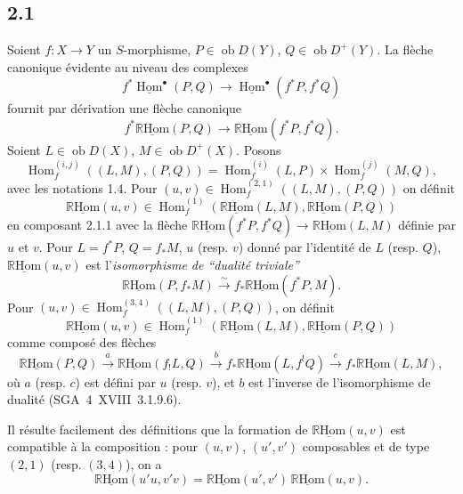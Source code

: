 \documentclass[11pt]{article}
\DeclareMathOperator{\Hom}{Hom}
\newcommand{\R}{\mathbb{R}}\newcommand{\RHomCore}{\mathbb{R}\mathrm{Hom}}
\newcommand{\ob}{\operatorname{ob}}
\providecommand{\RHom}{\RHomCore}
\providecommand{\uRHom}{\underline{\RHom}}
\providecommand{\RHom}{\RHomCore}
\providecommand{\Hom}{\operatorname{Hom}}
\providecommand{\ob}{\operatorname{ob}}
\providecommand{\RHom}{\R\mathcal{H}om}
\providecommand{\R}{\mathrm R}
\providecommand{\RHom}{\RHomCore}
\providecommand{\Hom}{\operatorname{Hom}}
\begin{document}
\subsection*{2.1}
Soient $f:X\to Y$ un $S$-morphisme, $P\in\ob D(Y)$, $Q\in\ob D^{+}(Y)$. La flèche canonique évidente au niveau des complexes
\[
f^{*}\underline{\Hom}^{\bullet}(P,Q)\longrightarrow\underline{\Hom}^{\bullet}(f^{*}P,f^{*}Q)
\]
fournit par dérivation une flèche canonique
\begin{equation}\tag{2.1.1}
f^{*}\uRHom(P,Q)\longrightarrow\uRHom(f^{*}P,f^{*}Q).
\end{equation}
Soient $L\in\ob D(X)$, $M\in\ob D^{+}(X)$. Posons
\begin{equation}\tag{2.1.2}
\Hom_f^{(i,j)}((L,M),(P,Q))=\Hom_f^{(i)}(L,P)\times\Hom_f^{(j)}(M,Q),
\end{equation}
avec les notations 1.4. Pour $(u,v)\in\Hom_f^{(2,1)}((L,M),(P,Q))$ on définit
\begin{equation}\tag{2.1.3}
\uRHom(u,v)\in\Hom_f^{(1)}(\uRHom(L,M),\uRHom(P,Q))
\end{equation}
en composant 2.1.1 avec la flèche $\uRHom(f^{*}P,f^{*}Q)\to\uRHom(L,M)$ définie par $u$ et $v$. Pour $L=f^{*}P$, $Q=f_{*}M$, $u$ (resp. $v$) donné par l'identité de $L$ (resp. $Q$), $\uRHom(u,v)$ est l'\emph{isomorphisme de ``dualité triviale''}
\begin{equation}\tag{2.1.4}
\uRHom(P,f_{*}M)\xrightarrow{\sim}f_{*}\uRHom(f^{*}P,M).
\end{equation}
Pour $(u,v)\in\Hom_f^{(3,4)}((L,M),(P,Q))$, on définit
\begin{equation}\tag{2.1.5}
\uRHom(u,v)\in\Hom_f^{(1)}(\uRHom(L,M),\uRHom(P,Q))
\end{equation}
comme composé des flèches
\[
\uRHom(P,Q)\xrightarrow{a}\uRHom(f_{!}L,Q)\xrightarrow{b}f_{*}\uRHom(L,f^{!}Q)\xrightarrow{c}f_{*}\uRHom(L,M),
\]
où $a$ (resp. $c$) est défini par $u$ (resp. $v$), et $b$ est l'inverse de l'isomorphisme de dualité (SGA~4~XVIII~3.1.9.6).

Il résulte facilement des définitions que la formation de $\uRHom(u,v)$ est compatible à la composition : pour $(u,v)$, $(u',v')$ composables et de type $(2,1)$ (resp. $(3,4)$), on a
\begin{equation}\tag{2.1.6}
\uRHom(u'u,v'v)=\uRHom(u',v')\,\uRHom(u,v).
\end{equation}

\end{document}
